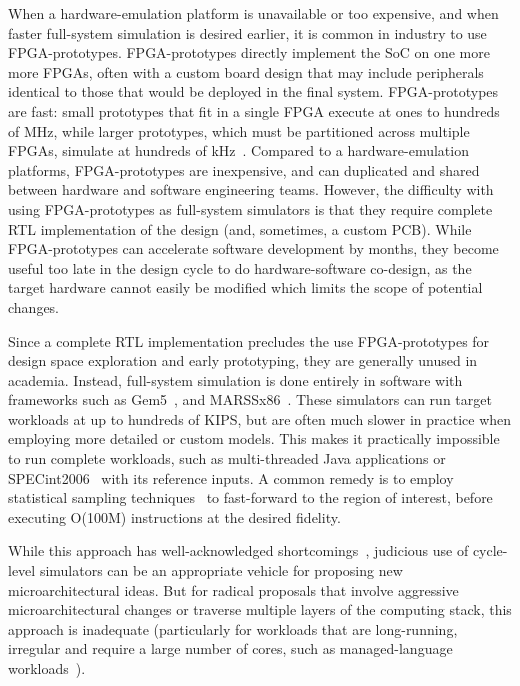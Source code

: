 When a hardware-emulation platform is unavailable or too expensive, and when
faster full-system simulation is desired earlier, it is common in industry to
use FPGA-prototypes. FPGA-prototypes directly implement the SoC on one more
more FPGAs, often with a custom board design that may include peripherals
identical to those that would be deployed in the final system.  FPGA-prototypes
are fast: small prototypes that fit in a single FPGA execute at ones to hundreds of
MHz, while larger prototypes, which must be partitioned across multiple FPGAs,
simulate at hundreds of kHz~\cite{nehalemprototype, atomprototype}.  Compared to
a hardware-emulation platforms, FPGA-prototypes are inexpensive, and can duplicated and
shared between hardware and software engineering teams. However, the difficulty with
using FPGA-prototypes as full-system simulators is that they require complete
RTL implementation of the design (and, sometimes, a custom PCB). While
FPGA-prototypes can accelerate software development by months, they become
useful too late in the design cycle to do hardware-software co-design, as the
target hardware cannot easily be modified which limits the scope of potential
changes.

Since a complete RTL implementation precludes the use FPGA-prototypes for
design space exploration and early prototyping, they are generally unused in
academia. Instead, full-system simulation is done entirely in software with
frameworks such as Gem5~\cite{gem5}, and MARSSx86~\cite{marssx86}.
These simulators can run target workloads at up to hundreds of KIPS, but are
often much slower in practice when employing more detailed or custom models. This
makes it practically impossible to run complete workloads, such as
multi-threaded Java applications or SPECint2006~\cite{spec} with its reference
inputs. A common remedy is to employ statistical sampling
techniques~\cite{smarts} to fast-forward to the region of interest, before
executing O(100M) instructions at the desired fidelity.

While this approach has well-acknowledged shortcomings~\cite{gem5error},
judicious use of cycle-level simulators can be an appropriate vehicle for
proposing new microarchitectural ideas. But for radical proposals that involve
aggressive microarchitectural changes or traverse multiple layers of the
computing stack, this approach is inadequate (particularly for workloads that
are long-running, irregular and require a large number of cores, such as
managed-language workloads~\cite{MicroSimPanel}). 

